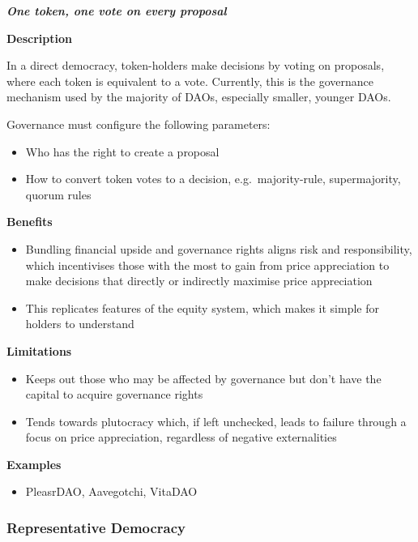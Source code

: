 \documentclass[
]{article}
\providecommand{\tightlist}{%
  \setlength{\itemsep}{0pt}\setlength{\parskip}{0pt}}
\begin{document}
\textbf{\emph{One token, one vote on every proposal}}

\textbf{Description}

In a direct democracy, token-holders make decisions by voting on
proposals, where each token is equivalent to a vote. Currently, this is
the governance mechanism used by the majority of DAOs, especially
smaller, younger DAOs.

Governance must configure the following parameters:

\begin{itemize}
\tightlist
\item
  Who has the right to create a proposal
\item
  How to convert token votes to a decision, e.g.~majority-rule,
  supermajority, quorum rules
\end{itemize}

\textbf{Benefits}

\begin{itemize}
\tightlist
\item
  Bundling financial upside and governance rights aligns risk and
  responsibility, which incentivises those with the most to gain from
  price appreciation to make decisions that directly or indirectly
  maximise price appreciation
\item
  This replicates features of the equity system, which makes it simple
  for holders to understand
\end{itemize}

\textbf{Limitations}

\begin{itemize}
\tightlist
\item
  Keeps out those who may be affected by governance but don't have the
  capital to acquire governance rights
\item
  Tends towards plutocracy which, if left unchecked, leads to failure
  through a focus on price appreciation, regardless of negative
  externalities
\end{itemize}

\textbf{Examples}

\begin{itemize}
\tightlist
\item
  PleasrDAO, Aavegotchi, VitaDAO
\end{itemize}

\hypertarget{representative-democracy}{%
\subsubsection{Representative
Democracy}\label{representative-democracy}}
\end{document}
